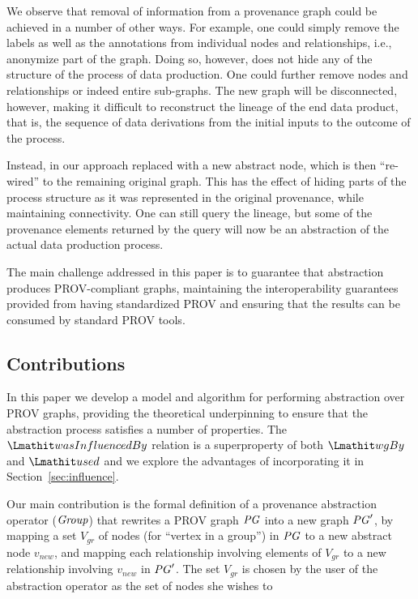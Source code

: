 We observe that removal of information from a provenance graph could be achieved in a number of other ways.
%
For example, one could simply remove the labels as well as the annotations from individual nodes and relationships, i.e., anonymize part of the graph. Doing so, however, does not hide any of the structure of the process of data production. One could further remove nodes and relationships or  indeed entire sub-graphs. The new graph will be disconnected, however, making it difficult to reconstruct the lineage of the end data product, that is, the sequence of data derivations from the initial inputs to the outcome of the process.

Instead, in our approach  replaced with a new abstract node, which is then ``re-wired'' to the remaining original graph. This has the effect of hiding parts of the process structure as it was represented in the original provenance, while maintaining connectivity. One can still query the lineage, but some of the provenance elements returned by the query will now be an abstraction of the actual data production process.

The main challenge addressed in this paper is to guarantee that abstraction produces PROV-compliant  graphs,   maintaining the interoperability guarantees provided from having standardized PROV and ensuring that the results can be consumed by standard PROV tools. %


\subsection{Contributions} \label{sec:contributions}

In this paper we develop a model and algorithm for performing  abstraction over PROV graphs, providing the theoretical underpinning to ensure that the abstraction process satisfies a number of properties.
%
 The $\influence$ relation is a superproperty of both $\wgby$ and $\used$ and  we explore the advantages of incorporating it in Section~\ref{sec:influence}.

%
Our main contribution is the formal  definition of a provenance abstraction operator ($\mathit{Group}$) that  rewrites  a PROV graph $\mathit{PG}$ into a new graph $\mathit{PG}'$, by  mapping a set $V_{gr}$ of nodes (for ``vertex in a group'') in $\mathit{PG}$ to a new abstract node $v_{new}$, and  mapping each relationship involving elements of $V_{gr}$  to a new relationship involving $v_{new}$ in $\mathit{PG}'$. 
The set $V_{gr}$ is chosen by the user of the abstraction operator as the set of nodes she wishes to 


